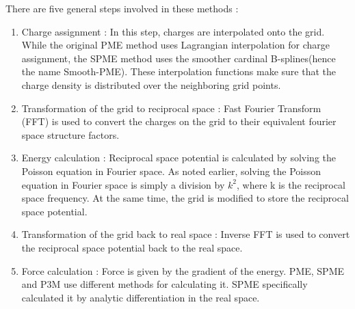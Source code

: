 \documentclass[9pt,bestpractices]{livecoms}
\begin{document}
There are five general steps involved in these methods :
\begin{enumerate}
\item Charge assignment : In this step, charges are interpolated onto the grid. While the original PME method uses Lagrangian interpolation for charge assignment, the SPME method uses the smoother cardinal B-splines(hence the name Smooth-PME). These interpolation functions make sure that the charge density is distributed over the neighboring grid points. 

\item Transformation of the grid to reciprocal space : Fast Fourier Transform (FFT) is used to convert the charges on the grid to their equivalent fourier space structure factors.

\item Energy calculation : Reciprocal space potential  is calculated by solving the Poisson equation in Fourier space. As noted earlier, solving the Poisson equation in Fourier space is simply a division by  $k^2$, where k is the reciprocal space frequency. At the same time, the grid is modified to store the reciprocal space potential.

%

\item Transformation of the grid back to real space : Inverse FFT is used to convert the reciprocal space potential back to the real space. 
\item Force calculation : Force is given by the gradient of the energy. PME, SPME and P3M use different methods for calculating it. SPME specifically calculated it by analytic differentiation in the real space. 
\end{enumerate}
\end{document}
